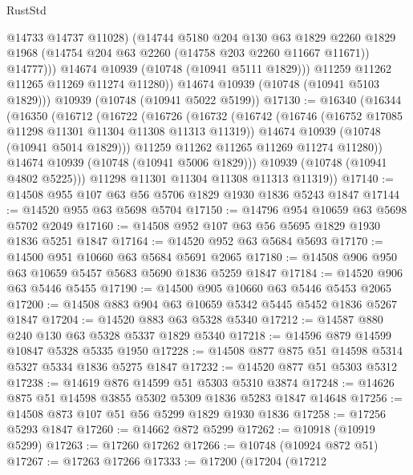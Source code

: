 \begin{lexlean}{RustStd}
\begin{coremodule}
                  @14733
                  @14737
                  @11028)
                (@14744
                  @5180
                  @204
                  @130
                  @63
                  @1829
                  @2260
                  @1829
                  @1968
                  (@14754 @204 @63 @2260 (@14758 @203 @2260 @11667 @11671))
                  @14777)))
            @14674
            @10939
            (@10748 (@10941 @5111 @1829)))
          @11259
          @11262
          @11265
          @11269
          @11274
          @11280))
      @14674
      @10939
      (@10748 (@10941 @5103 @1829)))
    @10939
    (@10748 (@10941 @5022 @5199))
@17130 := @16340
    (@16344
      (@16350
        (@16712
          (@16722
            (@16726
              (@16732
                (@16742
                  (@16746 (@16752 @17085 @11298 @11301 @11304 @11308 @11313 @11319))
                  @14674
                  @10939
                  (@10748 (@10941 @5014 @1829)))
                @11259
                @11262
                @11265
                @11269
                @11274
                @11280))
            @14674
            @10939
            (@10748 (@10941 @5006 @1829)))
          @10939
          (@10748 (@10941 @4802 @5225)))
        @11298
        @11301
        @11304
        @11308
        @11313
        @11319))
@17140 := @14508 @955 @107 @63 @56 @5706 @1829 @1930 @1836 @5243 @1847
@17144 := @14520 @955 @63 @5698 @5704
@17150 := @14796 @954 @10659 @63 @5698 @5702 @2049
@17160 := @14508 @952 @107 @63 @56 @5695 @1829 @1930 @1836 @5251 @1847
@17164 := @14520 @952 @63 @5684 @5693
@17170 := @14500 @951 @10660 @63 @5684 @5691 @2065
@17180 := @14508 @906 @950 @63 @10659 @5457 @5683 @5690 @1836 @5259 @1847
@17184 := @14520 @906 @63 @5446 @5455
@17190 := @14500 @905 @10660 @63 @5446 @5453 @2065
@17200 := @14508 @883 @904 @63 @10659 @5342 @5445 @5452 @1836 @5267 @1847
@17204 := @14520 @883 @63 @5328 @5340
@17212 := @14587 @880 @240 @130 @63 @5328 @5337 @1829 @5340
@17218 := @14596 @879 @14599 @10847 @5328 @5335 @1950
@17228 := @14508 @877 @875 @51 @14598 @5314 @5327 @5334 @1836 @5275 @1847
@17232 := @14520 @877 @51 @5303 @5312
@17238 := @14619 @876 @14599 @51 @5303 @5310 @3874
@17248 := @14626 @875 @51 @14598 @3855 @5302 @5309 @1836 @5283 @1847 @14648
@17256 := @14508 @873 @107 @51 @56 @5299 @1829 @1930 @1836
@17258 := @17256 @5293 @1847
@17260 := @14662 @872 @5299
@17262 := @10918 (@10919 @5299)
@17263 := @17260 @17262
@17266 := @10748 (@10924 @872 @51)
@17267 := @17263 @17266
@17333 := @17200
    (@17204
      (@17212

\end{coremodule}
\end{lexlean}
